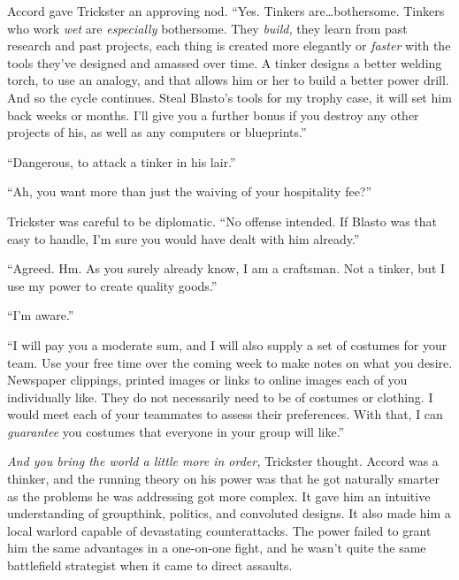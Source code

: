 Accord gave Trickster an approving nod.  ``Yes.  Tinkers are\ldots bothersome.  Tinkers who work \emph{wet} are \emph{especially} bothersome.  They \emph{build, }they learn from past research and past projects, each thing is created more elegantly or \emph{faster} with the tools they've designed and amassed over time.  A tinker designs a better welding torch, to use an analogy, and that allows him or her to build a better power drill.  And so the cycle continues.  Steal Blasto's tools for my trophy case, it will set him back weeks or months.  I'll give you a further bonus if you destroy any other projects of his, as well as any computers or blueprints.''



``Dangerous, to attack a tinker in his lair.''



``Ah, you want more than just the waiving of your hospitality fee?''



Trickster was careful to be diplomatic.  ``No offense intended.  If Blasto was that easy to handle, I'm sure you would have dealt with him already.''



``Agreed.  Hm.  As you surely already know, I am a craftsman.  Not a tinker, but I use my power to create quality goods.''



``I'm aware.''



``I will pay you a moderate sum, and I will also supply a set of costumes for your team.  Use your free time over the coming week to make notes on what you desire.  Newspaper clippings, printed images or links to online images each of you individually like.  They do not necessarily need to be of costumes or clothing.  I would meet each of your teammates to assess their preferences.  With that, I can \emph{guarantee} you costumes that everyone in your group will like.''



\emph{And you bring the world a little more in order, }Trickster thought.  Accord was a thinker, and the running theory on his power was that he got naturally smarter as the problems he was addressing got more complex.  It gave him an intuitive understanding of groupthink, politics, and convoluted designs.  It also made him a local warlord capable of devastating counterattacks.  The power failed to grant him the same advantages in a one-on-one fight, and he wasn't quite the same battlefield strategist when it came to direct assaults.



